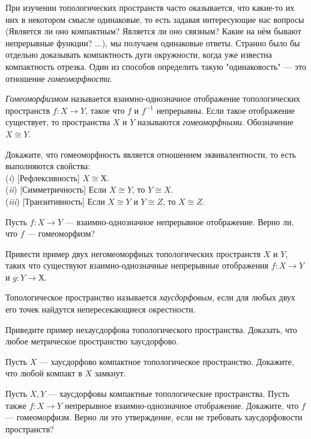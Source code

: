 \documentclass[a4paper,11pt]{article}
\begin{document}

{\footnotesize
При изучении топологических пространств часто оказывается, что какие-то их них в некотором смысле одинаковые, то есть задавая интересующие нас вопросы (Является ли оно компактным? Является ли оно связным? Какие на нём бывают непрерывные функции? ...), мы получаем одинаковые ответы. Странно было бы отдельно доказывать компактность дуги окружности, когда уже известна компактность отрезка. Один из способов определить такую "одинаковость" --- это отношение \emph{гомеоморфности}.

}

    \emph{Гомеоморфизмом} называется взаимно-однозначное отображение топологических пространств $f \colon X \to Y$, такое что $f$ и $f^{-1}$ непрерывны. Если такое отображение существует, то пространства $X$ и $Y$ называются \emph{гомеоморфными}. Обозначение $X \cong Y$.

    Докажите, что гомеоморфность является отношением эквивалентности, то есть выполняются свойства:\\
    ({\it i\/}) [Рефлексивность] $X \cong Х$. \\
    ({\it ii\/}) [Симметричность] Если $X \cong Y$, то $Y \cong X$.\\
    ({\it iii\/}) [Транзитивность] Если $X \cong Y$ и $Y \cong Z$, то $X \cong Z$.

    Пусть $f \colon X \to Y$ --- взаимно-однозначное непрерывное отображение. Верно ли, что $f$ --- гомеоморфизм?

   Привести пример двух негомеоморфных топологических пространств $X$ и $Y$, таких что существуют взаимно-однозначные непрерывные отображения $f\colon X \to Y$ и $g\colon Y \to Х$.

    Топологическое пространство называется \emph{хаусдорфовым}, если для любых двух его точек найдутся непересекающиеся окрестности.

    Приведите пример нехаусдорфова топологического пространства.
    Доказать, что любое метрическое пространство хаусдорфово.

    Пусть $X$ --- хаусдорфово компактное топологическое пространство. Докажите, что любой компакт в $X$ замкнут.

     Пусть $X, Y$ --- хаусдорфовы компактные топологические пространства. Пусть также $f\colon X \to Y$ непрерывное взаимно-однозначное отображение. Докажите, что $f$ --- гомеоморфизм.
     Верно ли это утверждение, если не требовать хаусдорфовости пространств?
\end{document}

